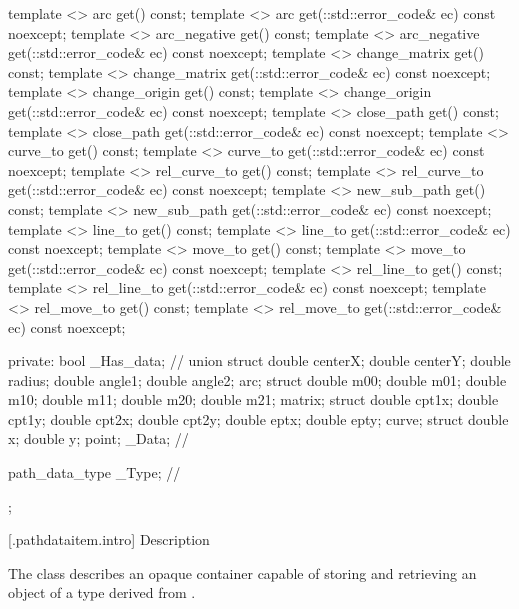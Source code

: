 \begin{codeblock}
{{{{{    template <>
    arc get() const;
    template <>
    arc get(::std::error_code& ec) const noexcept;
    template <>
    arc_negative get() const;
    template <>
    arc_negative get(::std::error_code& ec) const noexcept;
    template <>
    change_matrix get() const;
    template <>
    change_matrix get(::std::error_code& ec) const noexcept;
    template <>
    change_origin get() const;
    template <>
    change_origin get(::std::error_code& ec) const noexcept;
    template <>
    close_path get() const;
    template <>
    close_path get(::std::error_code& ec) const noexcept;
    template <>
    curve_to get() const;
    template <>
    curve_to get(::std::error_code& ec) const noexcept;
    template <>
    rel_curve_to get() const;
    template <>
    rel_curve_to get(::std::error_code& ec) const noexcept;
    template <>
    new_sub_path get() const;
    template <>
    new_sub_path get(::std::error_code& ec) const noexcept;
    template <>
    line_to get() const;
    template <>
    line_to get(::std::error_code& ec) const noexcept;
    template <>
    move_to get() const;
    template <>
    move_to get(::std::error_code& ec) const noexcept;
    template <>
    rel_line_to get() const;
    template <>
    rel_line_to get(::std::error_code& ec) const noexcept;
    template <>
    rel_move_to get() const;
    template <>
    rel_move_to get(::std::error_code& ec) const noexcept;

  private:
    bool _Has_data;         // \expos
    union {
      struct {
        double centerX;
        double centerY;
        double radius;
        double angle1;
        double angle2;
      } arc;
      struct {
        double m00;
        double m01;
        double m10;
        double m11;
        double m20;
        double m21;
      } matrix;
      struct {
        double cpt1x;
        double cpt1y;
        double cpt2x;
        double cpt2y;
        double eptx;
        double epty;
      } curve;
      struct {
        double x;
        double y;
      } point;
    } _Data;               // \expos

    path_data_type _Type;  // \expos
  };
} } } }
\end{codeblock}

 [\iotwod.pathdataitem.intro] { Description}

\pnum
{}
The class  describes an opaque container capable of storing and retrieving an object of a type derived from .

